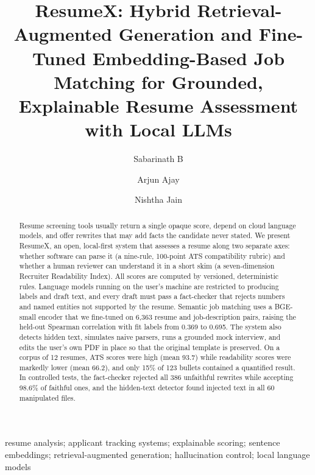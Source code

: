 \documentclass[3p,times,procedia]{elsarticle}
\begin{document}
\begin{frontmatter}


\title{ResumeX: Hybrid Retrieval-Augmented Generation and Fine-Tuned Embedding-Based Job Matching for Grounded, Explainable Resume Assessment with Local LLMs}

\author{Sabarinath B}
\author{Arjun Ajay}
\author{Nishtha Jain}

\address{School of Computing, Amrita Vishwa Vidyapeetham, Amritapuri Campus, Kollam, Kerala, India}

\begin{abstract}
Resume screening tools usually return a single opaque score, depend on cloud language models, and offer rewrites that may add facts the candidate never stated. We present ResumeX, an open, local-first system that assesses a resume along two separate axes: whether software can parse it (a nine-rule, 100-point ATS compatibility rubric) and whether a human reviewer can understand it in a short skim (a seven-dimension Recruiter Readability Index). All scores are computed by versioned, deterministic rules. Language models running on the user's machine are restricted to producing labels and draft text, and every draft must pass a fact-checker that rejects numbers and named entities not supported by the resume. Semantic job matching uses a BGE-small encoder that we fine-tuned on 6,363 resume and job-description pairs, raising the held-out Spearman correlation with fit labels from 0.369 to 0.695. The system also detects hidden text, simulates naive parsers, runs a grounded mock interview, and edits the user's own PDF in place so that the original template is preserved. On a corpus of 12 resumes, ATS scores were high (mean 93.7) while readability scores were markedly lower (mean 66.2), and only 15\% of 123 bullets contained a quantified result. In controlled tests, the fact-checker rejected all 386 unfaithful rewrites while accepting 98.6\% of faithful ones, and the hidden-text detector found injected text in all 60 manipulated files.
\end{abstract}

\begin{keyword}
resume analysis; applicant tracking systems; explainable scoring; sentence embeddings; retrieval-augmented generation; hallucination control; local language models
\end{keyword}
\end{frontmatter}
\end{document}
